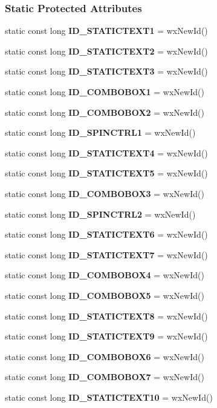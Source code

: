 \subsubsection*{Static Protected Attributes}
\begin{DoxyCompactItemize}
\item 
static const long {\bf I\+D\+\_\+\+S\+T\+A\+T\+I\+C\+T\+E\+X\+T1} = wx\+New\+Id()
\item 
static const long {\bf I\+D\+\_\+\+S\+T\+A\+T\+I\+C\+T\+E\+X\+T2} = wx\+New\+Id()
\item 
static const long {\bf I\+D\+\_\+\+S\+T\+A\+T\+I\+C\+T\+E\+X\+T3} = wx\+New\+Id()
\item 
static const long {\bf I\+D\+\_\+\+C\+O\+M\+B\+O\+B\+O\+X1} = wx\+New\+Id()
\item 
static const long {\bf I\+D\+\_\+\+C\+O\+M\+B\+O\+B\+O\+X2} = wx\+New\+Id()
\item 
static const long {\bf I\+D\+\_\+\+S\+P\+I\+N\+C\+T\+R\+L1} = wx\+New\+Id()
\item 
static const long {\bf I\+D\+\_\+\+S\+T\+A\+T\+I\+C\+T\+E\+X\+T4} = wx\+New\+Id()
\item 
static const long {\bf I\+D\+\_\+\+S\+T\+A\+T\+I\+C\+T\+E\+X\+T5} = wx\+New\+Id()
\item 
static const long {\bf I\+D\+\_\+\+C\+O\+M\+B\+O\+B\+O\+X3} = wx\+New\+Id()
\item 
static const long {\bf I\+D\+\_\+\+S\+P\+I\+N\+C\+T\+R\+L2} = wx\+New\+Id()
\item 
static const long {\bf I\+D\+\_\+\+S\+T\+A\+T\+I\+C\+T\+E\+X\+T6} = wx\+New\+Id()
\item 
static const long {\bf I\+D\+\_\+\+S\+T\+A\+T\+I\+C\+T\+E\+X\+T7} = wx\+New\+Id()
\item 
static const long {\bf I\+D\+\_\+\+C\+O\+M\+B\+O\+B\+O\+X4} = wx\+New\+Id()
\item 
static const long {\bf I\+D\+\_\+\+C\+O\+M\+B\+O\+B\+O\+X5} = wx\+New\+Id()
\item 
static const long {\bf I\+D\+\_\+\+S\+T\+A\+T\+I\+C\+T\+E\+X\+T8} = wx\+New\+Id()
\item 
static const long {\bf I\+D\+\_\+\+S\+T\+A\+T\+I\+C\+T\+E\+X\+T9} = wx\+New\+Id()
\item 
static const long {\bf I\+D\+\_\+\+C\+O\+M\+B\+O\+B\+O\+X6} = wx\+New\+Id()
\item 
static const long {\bf I\+D\+\_\+\+C\+O\+M\+B\+O\+B\+O\+X7} = wx\+New\+Id()
\item 
static const long {\bf I\+D\+\_\+\+S\+T\+A\+T\+I\+C\+T\+E\+X\+T10} = wx\+New\+Id()

\end{DoxyCompactItemize}

